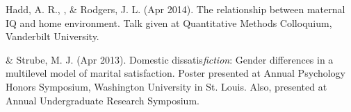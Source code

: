 \begin{etaremune}
%
\item Hadd, A. R., \meb, \& Rodgers, J. L. (Apr 2014). The relationship between maternal IQ and home environment. Talk given at Quantitative Methods Colloquium, Vanderbilt University.
%
\item\meb \& Strube, M. J. (Apr 2013). Domestic dissatis{\em fiction}: Gender differences in a multilevel model of marital satisfaction. Poster presented at Annual Psychology Honors Symposium, Washington University in St. Louis. Also, presented at Annual Undergraduate Research Symposium.
\end{etaremune}